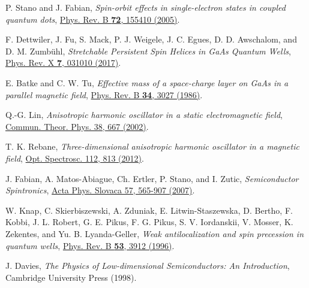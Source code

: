 \documentclass[aps,floatfix,twocolumn,showpacs,10pt,nofootinbib]{revtex4-1}
\begin{document}
\begin{thebibliography}{99}
P. Stano and J. Fabian, \textit{Spin-orbit effects in single-electron states in coupled quantum dots},
\href{https://doi.org/10.1103/PhysRevB.72.155410}{Phys. Rev. B \textbf{72}, 155410 (2005)}.

F. Dettwiler, J. Fu, S. Mack, P. J. Weigele, J. C. Egues, D. D. Awschalom, and D. M. Zumb\"uhl,
\textit{Stretchable Persistent Spin Helices in GaAs Quantum Wells},
\href{https://doi.org/10.1103/PhysRevX.7.031010}{Phys. Rev. X \textbf{7}, 031010 (2017)}.

E. Batke and C. W. Tu, \textit{Effective mass of a space-charge layer on GaAs in a parallel magnetic field},
\href{https://doi.org/10.1103/PhysRevB.34.3027}{Phys. Rev. B \textbf{34}, 3027 (1986)}.

Q.-G. Lin, \textit{Anisotropic harmonic oscillator in a static electromagnetic field},
\href{https://doi.org/10.1088/0253-6102/38/6/667}{Commun. Theor. Phys. 38, 667 (2002)}.

T. K. Rebane, \textit{Three-dimensional anisotropic harmonic oscillator in a magnetic field},
\href{https://doi.org/10.1134/S0030400X12060161}{Opt. Spectrosc. 112, 813 (2012)}.

J. Fabian, A. Matos-Abiague, Ch. Ertler, P. Stano, and I. Zutic, \textit{Semiconductor Spintronics},
\href{http://www.physics.sk/aps/pub.php?y=2007&pub=aps-07-04}{Acta Phys. Slovaca 57, 565-907 (2007)}.

W. Knap, C. Skierbiszewski, A. Zduniak, E. Litwin-Staszewska, D. Bertho, F. Kobbi, J. L. Robert, G. E. Pikus, F. G. Pikus, S. V. Iordanskii, V. Mosser, K. Zekentes, and Yu. B. Lyanda-Geller,
\textit{Weak antilocalization and spin precession in quantum wells},
\href{https://doi.org/10.1103/PhysRevB.53.3912}{Phys. Rev. B {\bf 53}, 3912 (1996)}.

J. Davies, \textit{The Physics of Low-dimensional Semiconductors: An Introduction},
Cambridge University Press (1998).

\end{thebibliography}
\end{document}
